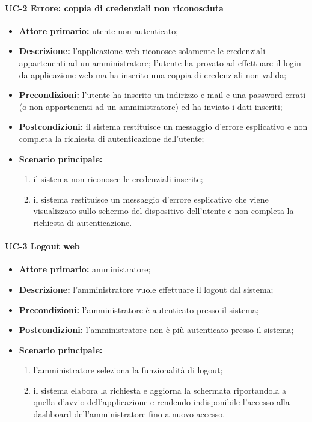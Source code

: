 \paragraph{UC-2 Errore: coppia di credenziali non riconosciuta}
\begin{itemize}
	\item \textbf{Attore primario:} utente non autenticato;

	\item \textbf{Descrizione:} l'applicazione web riconosce solamente le credenziali appartenenti ad un amministratore; l'utente ha provato ad effettuare il login da applicazione web ma ha inserito una coppia di credenziali non valida;

	\item \textbf{Precondizioni:} l'utente ha inserito un indirizzo e-mail e una password errati (o non appartenenti ad un amministratore) ed ha inviato i dati inseriti;

	\item \textbf{Postcondizioni:} il sistema restituisce un messaggio d'errore esplicativo e non completa la richiesta di autenticazione dell'utente;

	\item \textbf{Scenario principale:}
	      \begin{enumerate}
		      \item il sistema non riconosce le credenziali inserite;
		      \item il sistema restituisce un messaggio d'errore esplicativo che viene visualizzato sullo schermo del dispositivo dell'utente e non completa la richiesta di autenticazione.
	      \end{enumerate}
\end{itemize}

\paragraph{UC-3 Logout web}
\begin{itemize}
	\item \textbf{Attore primario:} amministratore;

	\item \textbf{Descrizione:} l'amministratore vuole effettuare il logout dal sistema;

	\item \textbf{Precondizioni:} l'amministratore è autenticato presso il sistema;

	\item \textbf{Postcondizioni:} l'amministratore non è più autenticato presso il sistema;

	\item \textbf{Scenario principale:}
	      \begin{enumerate}
		      \item l'amministratore seleziona la funzionalità di logout;
		      \item il sistema elabora la richiesta e aggiorna la schermata riportandola a quella d'avvio dell'applicazione e rendendo indisponibile l'accesso alla dashboard dell'amministratore fino a nuovo accesso.
	      \end{enumerate}
\end{itemize}


